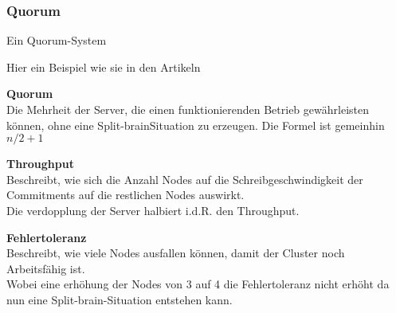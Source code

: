 
\subsubsection{Quorum}
\label{chap:Quorum}
Ein Quorum-System

Hier ein Beispiel wie sie in den Artikeln \cite{UMIGLCCI, YDS7DTYM, V4XLXN7W}
\begin{description}
    \item \textbf{Quorum}\hfill \\Die Mehrheit der Server, die einen funktionierenden Betrieb gewährleisten können, ohne eine \Gls{Split-brain}Situation zu erzeugen.
    Die Formel ist gemeinhin \(n/2 + 1\)
    \item \textbf{Throughput}\hfill \\Beschreibt, wie sich die Anzahl Nodes auf die Schreibgeschwindigkeit der Commitments auf die restlichen Nodes auswirkt.\\Die verdopplung der Server halbiert i.d.R. den Throughput.
    \item \textbf{Fehlertoleranz}\hfill \\Beschreibt, wie viele Nodes ausfallen können, damit der Cluster noch Arbeitsfähig ist.\\Wobei eine erhöhung der Nodes von 3 auf 4 die Fehlertoleranz nicht erhöht da nun eine \Gls{Split-brain}-Situation entstehen kann.
\end{description}
